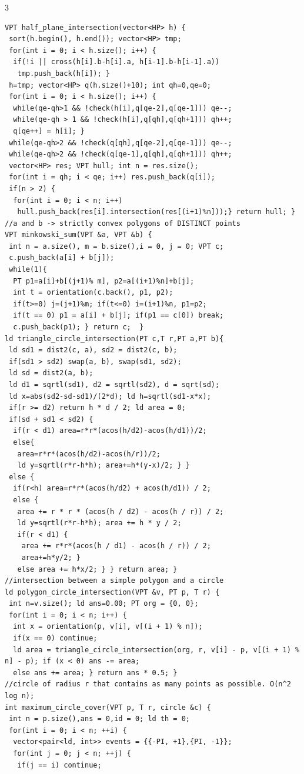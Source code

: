 \documentclass[8pt,a4paper,onesided]{article}
\begin{document}
\begin{multicols}{3}
\begin{verbatim}
VPT half_plane_intersection(vector<HP> h) {
 sort(h.begin(), h.end()); vector<HP> tmp;
 for(int i = 0; i < h.size(); i++) {
  if(!i || cross(h[i].b-h[i].a, h[i-1].b-h[i-1].a))
   tmp.push_back(h[i]); }
 h=tmp; vector<HP> q(h.size()+10); int qh=0,qe=0;
 for(int i = 0; i < h.size(); i++) {
  while(qe-qh>1 && !check(h[i],q[qe-2],q[qe-1])) qe--;
  while(qe-qh > 1 && !check(h[i],q[qh],q[qh+1])) qh++;
  q[qe++] = h[i]; }
 while(qe-qh>2 && !check(q[qh],q[qe-2],q[qe-1])) qe--;
 while(qe-qh>2 && !check(q[qe-1],q[qh],q[qh+1])) qh++;
 vector<HP> res; VPT hull; int n = res.size();
 for(int i = qh; i < qe; i++) res.push_back(q[i]);
 if(n > 2) {
  for(int i = 0; i < n; i++)
   hull.push_back(res[i].intersection(res[(i+1)%n]));} return hull; }
//a and b -> strictly convex polygons of DISTINCT points
VPT minkowski_sum(VPT &a, VPT &b) {
 int n = a.size(), m = b.size(),i = 0, j = 0; VPT c;
 c.push_back(a[i] + b[j]);
 while(1){
  PT p1=a[i]+b[(j+1)% m], p2=a[(i+1)%n]+b[j];
  int t = orientation(c.back(), p1, p2);
  if(t>=0) j=(j+1)%m; if(t<=0) i=(i+1)%n, p1=p2;
  if(t == 0) p1 = a[i] + b[j]; if(p1 == c[0]) break;
  c.push_back(p1); } return c;  }
ld triangle_circle_intersection(PT c,T r,PT a,PT b){
 ld sd1 = dist2(c, a), sd2 = dist2(c, b);
 if(sd1 > sd2) swap(a, b), swap(sd1, sd2);
 ld sd = dist2(a, b);
 ld d1 = sqrtl(sd1), d2 = sqrtl(sd2), d = sqrt(sd);
 ld x=abs(sd2-sd-sd1)/(2*d); ld h=sqrtl(sd1-x*x);
 if(r >= d2) return h * d / 2; ld area = 0;
 if(sd + sd1 < sd2) {
  if(r < d1) area=r*r*(acos(h/d2)-acos(h/d1))/2;
  else{
   area=r*r*(acos(h/d2)-acos(h/r))/2;
   ld y=sqrtl(r*r-h*h); area+=h*(y-x)/2; } }
 else {
  if(r<h) area=r*r*(acos(h/d2) + acos(h/d1)) / 2;
  else {
   area += r * r * (acos(h / d2) - acos(h / r)) / 2;
   ld y=sqrtl(r*r-h*h); area += h * y / 2;
   if(r < d1) {
    area += r*r*(acos(h / d1) - acos(h / r)) / 2;
    area+=h*y/2; } 
   else area += h*x/2; } } return area; }
//intersection between a simple polygon and a circle
ld polygon_circle_intersection(VPT &v, PT p, T r) {
 int n=v.size(); ld ans=0.00; PT org = {0, 0};
 for(int i = 0; i < n; i++) {
  int x = orientation(p, v[i], v[(i + 1) % n]);
  if(x == 0) continue;
  ld area = triangle_circle_intersection(org, r, v[i] - p, v[(i + 1) % n] - p); if (x < 0) ans -= area;
  else ans += area; } return ans * 0.5; }
//circle of radius r that contains as many points as possible. O(n^2 log n);
int maximum_circle_cover(VPT p, T r, circle &c) {
 int n = p.size(),ans = 0,id = 0; ld th = 0;
 for(int i = 0; i < n; ++i) {
  vector<pair<ld, int>> events = {{-PI, +1},{PI, -1}};
  for(int j = 0; j < n; ++j) {
   if(j == i) continue;

\end{verbatim}
\end{multicols}
\end{document}
